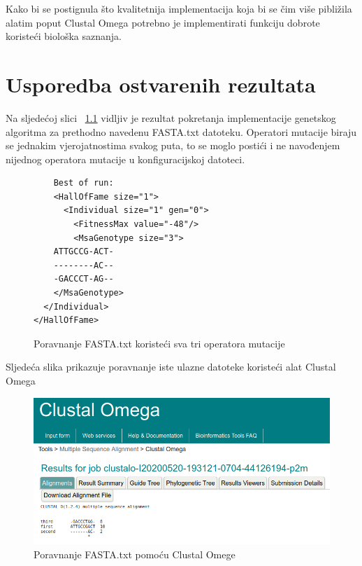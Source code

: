 \documentclass[times, utf8, zavrsni, numeric]{fer}
\begin{document}
  Kako bi se postignula što kvalitetnija implementacija koja bi se čim više pibližila alatim poput Clustal Omega potrebno je implementirati funkciju dobrote koristeći biološka saznanja.\newline
  
  
 
  

\chapter{Usporedba ostvarenih rezultata} \label{rezultati}
Na sljedećoj slici ~\ref{fig:svaTruOperatora} vidljiv je rezultat pokretanja implementacije genetskog algoritma za prethodno navedenu FASTA.txt datoteku. Operatori mutacije biraju se jednakim vjerojatnostima svakog puta, to se moglo postići i ne navođenjem nijednog operatora mutacije u konfiguracijskoj datoteci.



 \begin{figure} [httb]
	\begin{verbatim}
	Best of run:
	<HallOfFame size="1">
	  <Individual size="1" gen="0">
	    <FitnessMax value="-48"/>
	    <MsaGenotype size="3">
	ATTGCCG-ACT-
	--------AC--
	-GACCCT-AG--
    </MsaGenotype>
  </Individual>
</HallOfFame>
	\end{verbatim}
	\caption{Poravnanje FASTA.txt koristeći sva tri operatora mutacije}
	\label{fig:svaTruOperatora}
 \end{figure}

Sljedeća slika prikazuje poravnanje iste ulazne datoteke koristeći alat Clustal Omega

\begin{figure}[h]
	\includegraphics[]{slike/clustalMali.PNG}
	\centering
	\caption{Poravnanje FASTA.txt pomoću Clustal Omege}
	\label{fig:clustalMali}
\end{figure}
\end{document}

